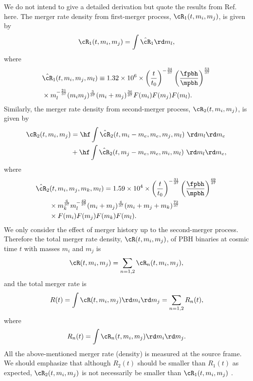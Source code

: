 \documentclass[
reprint,           %
superscriptaddress,%
amsmath,           %
amssymb,           %
aps,               %
prd,               %
notitlepage,       %
longbibliography,  %
floatfix,          %
nofootinbib,
]{revtex4-1}
\def\({\left(}
\def\){\right)}
\def\e{\begin{equation}}
\def\q{\end{equation}}
\begin{document}
We do not intend to give a detailed derivation but quote the results from Ref.~\cite{Liu:2019rnx} here.
The merger rate density from first-merger process, $\cR_1(t, m_i, m_j)$, is given by \cite{Liu:2019rnx}
\e 
\cR_1(t, m_i, m_j) = \int \hat{\cR}_1 \rd m_l,
\q 
where
\e 
\begin{split}
	&\hat{\cR}_1(t, m_i, m_j, m_l)
	\equiv 1.32 \times 10^6 \times \(\frac{t}{t_0}\)^{-\frac{34}{37}}\(\frac{\fpbh}{\mpbh}\)^\frac{53}{37} \\ 
	&\times m_l^{-\frac{21}{37}} (m_i m_j)^\frac{3}{37} (m_i + m_j)^\frac{36}{37} F(m_i) F(m_j) F(m_l).     
\end{split}
\q
Similarly, the merger rate density from second-merger process, $\cR_2(t, m_i, m_j)$, is given by \cite{Liu:2019rnx}
\e 
\begin{split}
	\cR_2(t, m_i, m_j) &= \hf \int \hat{\cR}_2(t, m_i-m_e, m_e, m_j, m_l)\ \rd m_l \rd m_e\\
	&+ \hf \int \hat{\cR}_2(t, m_j-m_e, m_e, m_i, m_l)\ \rd m_l \rd m_e,
\end{split}
\q 
where
\e 
\begin{split}
	&\hat{\cR}_2(t, m_i, m_j,m_k, m_l)
	=1.59 \times 10^4 \times \(\frac{t}{t_0}\)^{-\frac{31}{37}} \(\frac{\fpbh}{\mpbh}\)^\frac{69}{37}\\ 
	&\qquad\times m_k^{\frac{6}{37}} m_l^{-\frac{42}{37}} (m_i+ m_j)^\frac{6}{37} (m_i + m_j + m_k)^\frac{72}{37}\\
	&\qquad\times F(m_i) F(m_j) F(m_k) F(m_l).     
\end{split}
\q
We only consider the effect of merger history up to the second-merger process.
Therefore the total merger rate density, $\cR(t, m_i, m_j)$, of PBH binaries at cosmic time $t$ with masses $m_i$ and $m_j$ is
\e\label{cR}
\cR(t, m_i, m_j) =  \sum_{n=1,2} \cR_n(t, m_i, m_j),
\q 
and the total merger rate is
\e\label{Rt}
R(t) = \int \cR(t, m_i, m_j) \rd m_i \rd m_j = \sum_{n=1,2} R_n(t),
\q 
where
\e 
R_n(t) = \int \cR_n(t, m_i, m_j) \rd m_i \rd m_j.
\q 
All the above-mentioned merger rate (density) is measured at the source frame.
We should emphasize that although $R_2(t)$ should be smaller than $R_1(t)$ as expected, $\cR_2(t, m_i, m_j)$ is not necessarily be smaller than $\cR_1(t, m_i, m_j)$ \cite{Liu:2019rnx}. 

\end{document}
